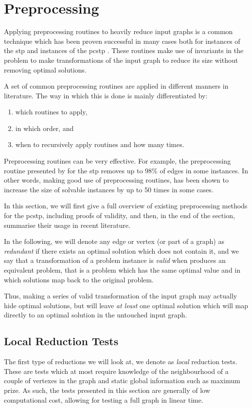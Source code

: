  \section{Preprocessing}
 \label{sec:solving:pre}
Applying preprocessing routines to heavily reduce input graphs is a common technique which has been proven successful in many cases both for instances of the \gls{stp}
\citep{koch1998solving}
and instances of the \gls{pcstp}
\citep{lucena2004strong,canuto2001local,ljubic2005solving, gamrath2017scip}. %
These routines make use of invariants in the problem to make transformations of the
input graph to reduce its size without removing optimal solutions.

A set of common preprocessing routines are applied in different manners in literature.
The way in which this is done is mainly differentiated by:
\begin{enumerate}[label=\alph*)]
\item which routines to apply,
\item in which order, and
\item when to recursively apply routines and how many times.
\end{enumerate}
Preprocessing routines can be very effective. For example, the preprocessing routine
presented by \citet{koch1998solving} for the \gls{stp} removes
up to 98\% of edges in some instances. In other words, making good use of preprocessing
routines, has been shown to increase the size of solvable instances by up to 50 times in some
cases.

In this section, we will first give a full overview of
existing preprocessing methods for the \gls{pcstp},
 including proofs of validity,
 and then, in the end of the section,
 summarise their usage in recent literature.

 In the following, we will denote any edge or vertex (or part of a graph) as
 \textit{redundant} if there exists an optimal solution
  which does not contain it, and we say that a 
  transformation of a problem instance is \textit{valid} when produces an
  equivalent problem, that is a problem which has the same optimal
  value and in which solutions map back to the original problem.

  Thus, making a series of valid transformation of the input graph may actually
  hide optimal solutions, but will leave \textit{at least} one optimal solution
  which will map directly to an optimal solution in the untouched input graph.
 \subsection{Local Reduction Tests}\label{sec:pre:local}
 The first type of reductions we will look at, we denote as \textit{local} reduction tests.
 These are tests which at most require knowledge
 of the neighbourhood of a couple of vertexes in the graph
 and static global information
 such as maximum prize. As such, the tests
 presented in this section are generally of low computational cost,
 allowing for testing a full graph in linear time.

